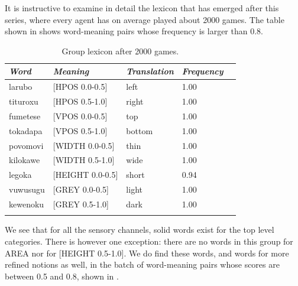 It is instructive to examine in detail the lexicon 
that has emerged after this series, where every agent
has on average played about 2000 games. The table shown in  
shows word-meaning pairs whose 
frequency is larger than 0.8. 


\begin{table}
\begin{center}
\begin{tabular}{ l  l  l  l  l }
\lsptoprule
{\itshape Word}&{\itshape Meaning}& {\itshape Translation} & {\itshape Frequency} \\ \midrule
larubo & [HPOS 0.0-0.5] & left & 1.00 \\ 
tituroxu & [HPOS 0.5-1.0] & right & 1.00 \\ 
fumetese & [VPOS 0.0-0.5] & top & 1.00 \\ 
tokadapa & [VPOS 0.5-1.0] & bottom & 1.00 \\ 
povomovi & [WIDTH 0.0-0.5] & thin & 1.00 \\ 
kilokawe & [WIDTH 0.5-1.0] & wide & 1.00 \\ 
legoka & [HEIGHT 0.0-0.5] & short & 0.94\\  
vuwusugu & [GREY 0.0-0.5] & light & 1.00 \\ 
kewenoku & [GREY 0.5-1.0] & dark & 1.00 \\ 
\lspbottomrule
\end{tabular}
\caption{\label{tab:after2000} Group lexicon after 2000 games.}
\end{center}
\end{table}

We see that for all the sensory channels, solid words
exist for the top level categories. There is however
one exception: there are no words in this group for AREA
nor for [HEIGHT 0.5-1.0]. We do find these words, and 
words for more refined notions as well, in the 
batch of word-meaning pairs whose scores are between 0.5 and 0.8, shown 
in . 



